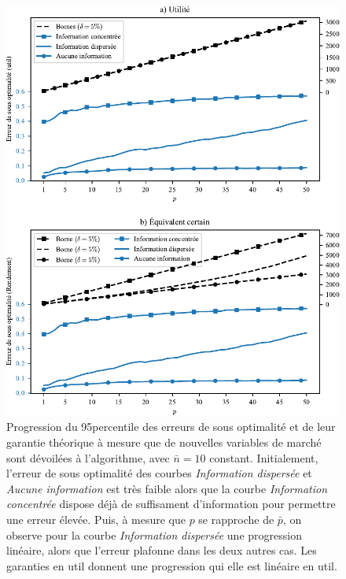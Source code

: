 \begin{figure}[h!]
  \centering
  \includegraphics[width=\textwidth]{../experiments/fig/pconst_so.pdf}
  \caption[Erreur de sous optimalité en fonction de $p$]{Progression du 95\ieme percentile
    des erreurs de sous optimalité et de leur garantie théorique à mesure que de nouvelles
    variables de marché sont dévoilées à l'algorithme, avec $\bar n = 10$
    constant. Initialement, l'erreur de sous optimalité des courbes \textit{Information
      dispersée} et \textit{Aucune information} est très faible alors que la courbe
    \textit{Information concentrée} dispose déjà de suffisament d'information pour
    permettre une erreur élevée. Puis, à mesure que $p$ se rapproche de $\bar p$, on
    observe pour la courbe \textit{Information dispersée} une progression linéaire, alors
    que l'erreur plafonne dans les deux autres cas. Les garanties en util donnent une
    progression qui elle est linéaire en util. }
  \label{fig_pconst_infosorelative}
\end{figure}


\clearpage

